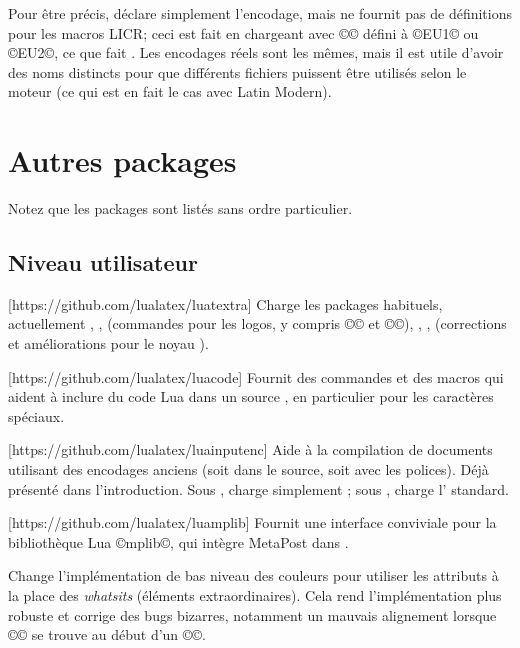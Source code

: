 \documentclass{lltxdoc}
\begin{document}
Pour être précis,  déclare simplement l'encodage, mais ne fournit pas
de définitions pour les macros LICR; ceci est fait en chargeant 
avec ©\UTFencname© défini à ©EU1© ou ©EU2©, ce que fait .
Les encodages réels sont les mêmes, mais il est utile d'avoir des noms distincts
pour que différents fichiers  puissent être utilisés selon le moteur
(ce qui est en fait le cas avec Latin Modern).

\section{Autres packages}\label{other}

Notez que les packages sont listés sans ordre particulier.

\subsection{Niveau utilisateur}

[https://github.com/lualatex/luatextra]
Charge les packages habituels, actuellement , , 
(commandes pour les logos, y compris ©\LuaTeX© et ©\LuaLaTeX©), ,
,  (corrections et améliorations pour le noyau \latex).

[https://github.com/lualatex/luacode]
Fournit des commandes et des macros qui aident à inclure du code Lua
dans un source \tex, en particulier pour les caractères spéciaux.

[https://github.com/lualatex/luainputenc]
Aide à la compilation de documents utilisant des encodages anciens
(soit dans le source, soit avec les polices). Déjà présenté dans l'introduction.
Sous \xetex, charge simplement ; sous \pdftex,
charge l' standard.

[https://github.com/lualatex/luamplib]
Fournit une interface conviviale pour la bibliothèque Lua ©mplib©,
qui intègre MetaPost dans \luatex.

Change l'implémentation de bas niveau des couleurs pour utiliser les attributs
\luatex à la place des \emph{whatsits} (\og{}éléments extraordinaires\fg{}).
Cela rend l'implémentation plus robuste et corrige des bugs bizarres, notamment
un mauvais alignement lorsque ©\color© se trouve au début d'un ©\vbox©.
\end{document}
